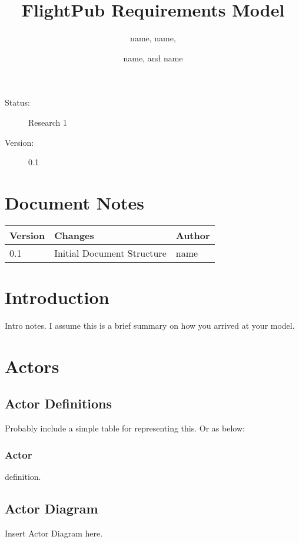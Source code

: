 \documentclass[english,12pt]{scrartcl}
\title{FlightPub Requirements Model}
\author{name, name, \and name, and name}
\begin{document}
	\maketitle
	\vfill
	{\large
		\begin{description}
			\item [Status:] Research 1
			\item [Version:] 0.1
		\end{description}
	}
	\clearpage
	\tableofcontents
	\vfill
	\section{Document Notes}
		\begin{tabular}{ | p{} | p{} | p{} |}
			\hline
			\textbf{Version} & \textbf{Changes} & \textbf{Author} \\
			\hline

			0.1 &
			Initial Document Structure &
			name \\
			\hline
			
		\end{tabular}
		
	\clearpage
	
	\section{Introduction} {
		Intro notes. I assume this is a brief summary on how you arrived at your model.
	}
	
	\section{Actors} {
		\subsection{Actor Definitions} {
			Probably include a simple table for representing this. Or as below:
			
			\subsubsection{Actor} { 
				definition.
			}
		}
		\subsection{Actor Diagram} {
			Insert Actor Diagram here.
		}
	}
	
\end{document}
